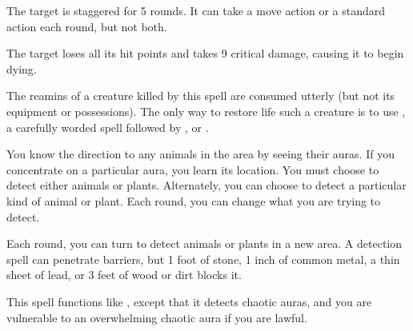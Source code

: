 \spellrng{\rngclose}
\begin{spellhealthy}
  The target is staggered for 5 rounds. It can take a move action or a standard action each round, but not both.
\end{spellhealthy}
\begin{spellblood}
  The target loses all its hit points and takes 9 critical damage, causing it to begin dying.
\end{spellblood}
\begin{spellnotes}
  The reamins of a creature killed by this spell are consumed utterly (but not its equipment or possessions). The only way to restore life such a creature is to use , a carefully worded  spell followed by , or .
\end{spellnotes}

\begin{spelleffect}
  You know the direction to any animals in the area by seeing their auras. If you concentrate on a particular aura, you learn its location. You must choose to detect either animals or plants. Alternately, you can choose to detect a particular kind of animal or plant. Each round, you can change what you are trying to detect.
\end{spelleffect}
\begin{spellnotes}
  Each round, you can turn to detect animals or plants in a new area. A detection spell can penetrate barriers, but 1 foot of stone, 1 inch of common metal, a thin sheet of lead, or 3 feet of wood or dirt blocks it.
\end{spellnotes}

\begin{spelleffect}
  This spell functions like , except that it detects chaotic auras, and you are vulnerable to an overwhelming chaotic aura if you are lawful.
\end{spelleffect}

